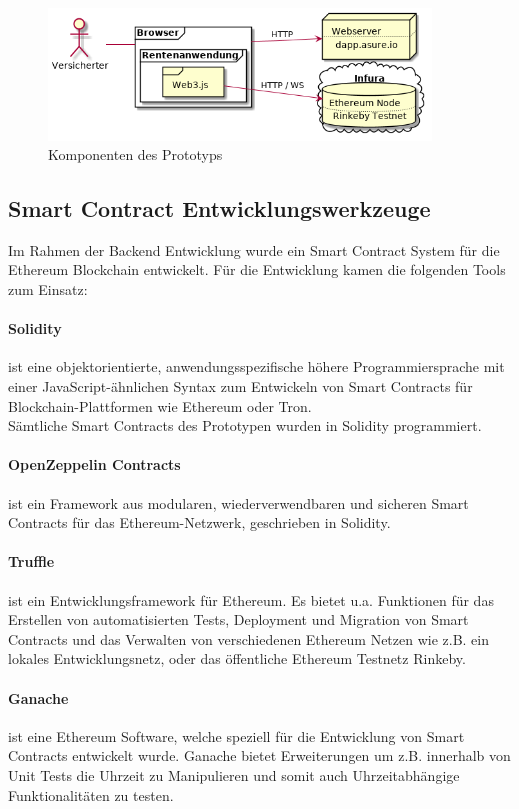 \begin{figure}
    \centering
    \includegraphics[width=4.0in]{images/components.png}
    \caption{Komponenten des Prototyps}
\end{figure}


\subsection*{Smart Contract Entwicklungswerkzeuge}
Im Rahmen der Backend Entwicklung wurde ein Smart Contract System für die Ethereum Blockchain entwickelt. Für die Entwicklung kamen die folgenden Tools zum Einsatz:

\paragraph*{Solidity} ist eine objektorientierte, anwendungsspezifische höhere Programmiersprache mit einer JavaScript-ähnlichen Syntax zum Entwickeln von Smart Contracts für Blockchain-Plattformen wie Ethereum oder Tron.\\ %
Sämtliche Smart Contracts des Prototypen wurden in Solidity programmiert.

\paragraph*{OpenZeppelin Contracts} ist ein Framework aus modularen, wiederverwendbaren und sicheren Smart Contracts für das Ethereum-Netzwerk, geschrieben in Solidity.

\paragraph*{Truffle} ist ein Entwicklungsframework für Ethereum. Es bietet u.a. Funktionen für das Erstellen von automatisierten Tests, Deployment und Migration von Smart Contracts und das Verwalten von verschiedenen Ethereum Netzen wie z.B. ein lokales Entwicklungsnetz, oder das öffentliche Ethereum Testnetz Rinkeby.

\paragraph*{Ganache} ist eine Ethereum Software, welche speziell für die Entwicklung von Smart Contracts entwickelt wurde. Ganache bietet Erweiterungen um z.B. innerhalb von Unit Tests die Uhrzeit zu Manipulieren und somit auch Uhrzeitabhängige Funktionalitäten zu testen.

